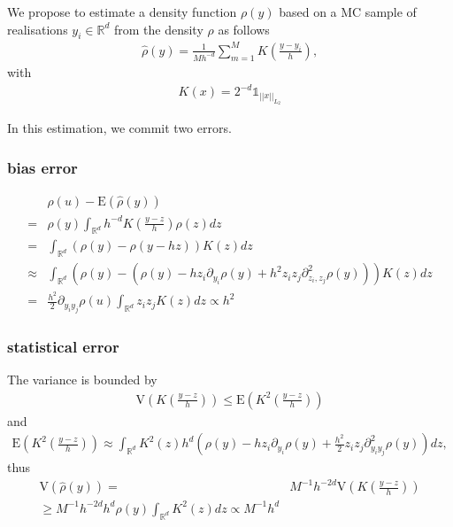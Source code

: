 \documentclass[a4paper,11pt]{article}
\newcommand{\parent}[1]{\left( {#1} \right)}
\newcommand{\absval}[1]{\left| {#1} \right|}
\newcommand{\ssum}[2]{\displaystyle\sum\limits_{#1}^{#2}}
\newcommand{\nnorm}[2]{\absval{\absval{{#1}}}_{#2}}
\newcommand{\expp}[1]{\mathrm{E} \parent{{#1}}}
\begin{document}
We propose to estimate
a density function $\rho \parent{y}$
based on a MC sample of realisations $y_i \in \mathbb R^d$
from the density $\rho$ as follows
\begin{align}
\hat \rho \parent{y} = \frac{1}{M h^{-d}} \ssum{m=1}{M} K \parent{\frac{y-y_i}{h}},
\end{align}
with
\begin{align}
K \parent{x} = 2^{-d} \mathbb 1_{\nnorm{x}{L_2}}
\end{align}

In this estimation, we commit two errors.

\subsubsection*{bias error}

\begin{align}&\rho \parent{u} - \expp{\hat \rho \parent{y}}
\\
=& 
\rho \parent{y }
\int_{\mathbb R^d} h^{-d} K \parent{\frac{y-z}{h}} \rho \parent{z} dz
\\
=& \int_{\mathbb R^d} \parent{\rho \parent{y}- \rho \parent{y-h z}}  K\parent{z} dz
\\
\approx & 
\int_{\mathbb R^d}
\parent{\rho \parent{y} - \parent{\rho \parent{y} - h z_i \partial_{y_i} \rho \parent{y} + h^2 z_i z_j \partial_{z_i,z_j}^2 \rho \parent{y} }}
K \parent{z}
dz
\\
= & \frac{h^2}{2}  \partial_{y_i y_j} \rho \parent{u} \int_{\mathbb R^d} z_i z_j K \parent{z}  dz \propto h^2
\end{align}

\subsubsection*{statistical error}

The variance is bounded by
\begin{align}
\mathrm{V} \parent{K \parent{\frac{y-z}{h}}} \leq \expp{K^2 \parent{\frac{y-z}{h}}}
\end{align}
and
\begin{align}
\expp{K^2 \parent{\frac{y-z}{h}}}
\approx
\int_{\mathbb R^d}
K^2 \parent{z} h^d \parent{\rho \parent{y} - h z_i \partial_{y_i} \rho \parent{y} + \frac{h^2}{2} z_i z_j \partial_{y_i y_j}^2 \rho \parent{y} }
dz,
\end{align}
thus
\begin{align}
\mathrm{V} \parent{\hat \rho \parent{y}}
=& M^{-1} h^{-2d} \mathrm{V} \parent{K \parent{\frac{y-z}{h}}}
\\
\geq M^{-1} h^{-2d} h^{d} \rho \parent{y} \int_{\mathbb R^d} K^2 \parent{z} dz
\propto M^{-1} h^{d}
\end{align}
\end{document}
